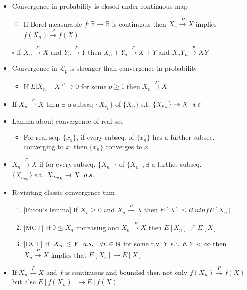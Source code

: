 \documentclass[12pt, A4]{article}
\begin{document}
\begin{itemize}
\begin{itemize}
	\end{itemize} 
	\item Convergence in probability is closed under continuous map
	\begin{itemize}
		\item If Borel measurable $f : \mathbb{R}\rightarrow \mathbb{R}$ is continuous then $X_n \xrightarrow{P} X$ implies $f(X_n)\xrightarrow{P} f(X)$ 
	\end{itemize}
	\item[$\square$] If $X_n\xrightarrow{P} X$ and $Y_n\xrightarrow{P} Y$ then $X_n+Y_n\xrightarrow{P} X+Y$ and $X_nY_n\xrightarrow{P} XY$
	\item Convergence in $\mathcal{L}_p$ is stronger than convergence in probability
	\begin{itemize}
		\item If $E|X_n-X|^p\rightarrow 0$ for some $p\geq 1$ then $X_n\xrightarrow{P}X$
	\end{itemize}
	\item If $X_n\xrightarrow{P} X$ then $\exists$ a subseq $\{X_{n_k}\}$ of $\{X_n\}$ s.t. $\{X_{n_k}\}\rightarrow X \hspace{0.2cm} a.s.$
	\item Lemma about convergence of real seq
	\begin{itemize}
		\item For real seq. $\{x_n\}$,  if every subseq. of $\{x_n\}$ has a further subseq. converging to $x$, then $\{x_n\}$ converges to $x$
	\end{itemize}
	\item $X_n\xrightarrow{P} X$ if for every subseq. $\{X_{n_m}\}$ of $\{X_n\}, \exists$ a further subseq. \\ $\{X_{n_{m_k}}\}$ s.t. $X_{n_{m_k}}\rightarrow X \hspace{0.2cm} a.s.$	
	\item Revisiting classic convergence thm
	\begin{enumerate}
		\item {[Fatou's lemma]} If $X_n \geq 0$ and $X_n \xrightarrow{P} X$ then $E[X]\leq liminfE[X_n]$
		\item {[MCT]} If $0\leq X_n$ increasing and $X_n\xrightarrow{P}X$ then $E[X_n]\nearrow E[X]$
		\item {[DCT]} If $|X_n|\leq Y \hspace{0.2cm} a.s.\hspace{0.3cm} \forall n\in \mathbb{N}$ for some r.v. Y s.t. $E|Y|<\infty$ then $X_n\xrightarrow{P} X$ implies that $E[X_n]\rightarrow E[X]$
	\end{enumerate}
	\item If $X_n\xrightarrow{P} X$ and $f$ is continuous and bounded \newline then not only $f(X_n)\xrightarrow{P}f(X)$ but also $E[f(X_n)]\rightarrow E[f(X)]$
\end{itemize}
\end{document}

